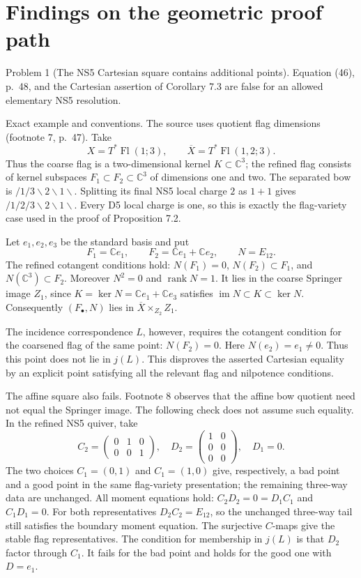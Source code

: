 \documentclass[10pt]{article}
\begin{document}
\section*{Findings on the geometric proof path}
Problem 1 (The NS5 Cartesian square contains additional points).  Equation (46), p. 48, and the Cartesian assertion of Corollary 7.3 are false for an allowed elementary NS5 resolution.\par
Exact example and conventions. The source uses quotient flag dimensions (footnote 7, p. 47). Take \[X=T^*\operatorname{Fl}(1;3),\qquad \overline X=T^*\operatorname{Fl}(1,2;3).\] Thus the coarse flag is a two-dimensional kernel \(K\subset\mathbb C^3\); the refined flag consists of kernel subspaces \(F_1\subset F_2\subset\mathbb C^3\) of dimensions one and two. The separated bow is \(/1/3\backslash2\backslash1\backslash\). Splitting its final NS5 local charge \(2\) as \(1+1\) gives \(/1/2/3\backslash2\backslash1\backslash\). Every D5 local charge is one, so this is exactly the flag-variety case used in the proof of Proposition 7.2.\par
Let \(e_1,e_2,e_3\) be the standard basis and put \[F_1=\mathbb Ce_1,\qquad F_2=\mathbb Ce_1+\mathbb Ce_2,\qquad
 N=E_{12}.\] The refined cotangent conditions hold: \(N(F_1)=0\), \(N(F_2)\subset F_1\), and \(N(\mathbb C^3)\subset F_2\). Moreover \(N^2=0\) and \(\operatorname{rank}N=1\). It lies in the coarse Springer image \(Z_1\), since \(K=\ker N=\mathbb Ce_1+\mathbb Ce_3\) satisfies \(\operatorname{im}N\subset K\subset\ker N\). Consequently \((F_\bullet,N)\) lies in \(\overline X\times_{Z_2}Z_1\).\par
The incidence correspondence \(L\), however, requires the cotangent condition for the coarsened flag of the same point: \(N(F_2)=0\). Here \(N(e_2)=e_1\ne0\). Thus this point does not lie in \(j(L)\). This disproves the asserted Cartesian equality by an explicit point satisfying all the relevant flag and nilpotence conditions.\par
The affine square also fails. Footnote 8 observes that the affine bow quotient need not equal the Springer image. The following check does not assume such equality. In the refined NS5 quiver, take \[C_2=\begin{pmatrix}0&1&0\\0&0&1\end{pmatrix},\quad
 D_2=\begin{pmatrix}1&0\\0&0\\0&0\end{pmatrix},\quad D_1=0.\] The two choices \(C_1=(0,1)\) and \(C_1=(1,0)\) give, respectively, a bad point and a good point in the same flag-variety presentation; the remaining three-way data are unchanged. All moment equations hold: \(C_2D_2=0=D_1C_1\) and \(C_1D_1=0\). For both representatives \(D_2C_2=E_{12}\), so the unchanged three-way tail still satisfies the boundary moment equation. The surjective \(C\)-maps give the stable flag representatives. The condition for membership in \(j(L)\) is that \(D_2\) factor through \(C_1\). It fails for the bad point and holds for the good one with \(D=e_1\).\par
\end{document}
